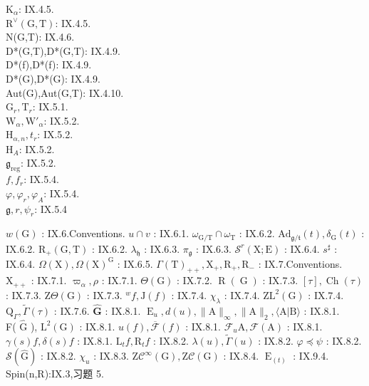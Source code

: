 \(\mathrm{K}_{\alpha}\): IX.4.5.\\
\(\mathrm{R}^{\vee}(\mathrm{G},\mathrm{T})\): IX.4.5.\\
N(G,T): IX.4.6.\\
D*(G,T),D*(G,T): IX.4.9.\\
D*(f),D*(f): IX.4.9.\\
D*(G),D*(G): IX.4.9.\\
Aut(G),Aut(G,T): IX.4.10.\\
\(\mathrm{G}_{r},\mathrm{T}_{r}\): IX.5.1.\\
\(\mathrm{W}_{\alpha},\mathrm{W}'_{\alpha}\): IX.5.2.\\
\(\mathrm{H}_{\alpha,n},t_{r}\): IX.5.2.\\
\(\mathrm{H}_{A}\): IX.5.2.\\
\(\mathfrak{g}_{\mathrm{reg}}\): IX.5.2.\\
\(f,f_{r}\): IX.5.4.\\
\(\varphi,\varphi_{r},\varphi_{A}\): IX.5.4.\\
\(\mathfrak{g},r,\psi_{r}\): IX.5.4

\(w(\mathrm{G})\) : IX.6.Conventions. \(u\cap v\) : IX.6.1. \(\omega_{\mathrm{G / T}}\cap \omega_{\mathrm{T}}\) : IX.6.2. \(\mathrm{Ad}_{\mathfrak{g} / \mathfrak{t}}(t),\delta_{\mathrm{G}}(t)\) : IX.6.2. \(\mathrm{R}_+(\mathrm{G},\mathrm{T})\) : IX.6.2. \(\lambda_{\mathfrak{h}}\) : IX.6.3. \(\pi_{\mathfrak{g}}\) : IX.6.3. \(\mathcal{S}^r (\mathrm{X};\mathrm{E})\) : IX.6.4. \(s^\sharp\) : IX.6.4. \(\Omega (\mathrm{X}),\Omega (\mathrm{X})^{\mathrm{G}}\) : IX.6.5. \(\Gamma (\mathrm{T})_{++},\mathrm{X}_{+},\mathrm{R}_{+},\mathrm{R}_{-}\) : IX.7.Conventions. \(\mathrm{X}_{++}\) : IX.7.1. \(\varpi_{\alpha},\rho\) : IX.7.1. \(\Theta (\mathrm{G})\) : IX.7.2. \(\operatorname {R}(\operatorname {G})\) : IX.7.3. \([\tau ],\operatorname {Ch}(\tau)\) : IX.7.3. \(\mathrm{Z}\Theta (\mathrm{G})\) : IX.7.3. \(^w f,\mathrm{J}(f)\) : IX.7.4. \(\chi_{\lambda}\) : IX.7.4. \(\mathrm{ZL}^2 (\mathrm{G})\) : IX.7.4. \(\mathrm{Q}_{\Gamma},\tilde{\Gamma} (\tau)\) : IX.7.6. \(\hat{\mathbf{G}}\) : IX.8.1. \(\operatorname {E}_u,d(u),\| \mathrm{A}\|_\infty ,\| \mathrm{A}\| _2,\langle \mathrm{A}|\mathrm{B}\rangle\) : IX.8.1.\\
F( \(\hat{\mathrm{G}}\) ), \(\mathrm{L}^2 (\mathrm{G})\) : IX.8.1. \(u(f),\overline{\mathcal{F}} (f)\) : IX.8.1. \(\mathcal{F}_u\mathrm{A},\mathcal{F}(\mathrm{A})\) : IX.8.1. \(\gamma (s)f,\delta (s)f\) : IX.8.1. \(\mathrm{L}_t f,\mathrm{R}_t f\) : IX.8.2. \(\lambda (u),\tilde{\Gamma} (u)\) : IX.8.2. \(\varphi \preccurlyeq \psi\) : IX.8.2. \(\mathcal{S}(\hat{\mathrm{G}})\) : IX.8.2. \(\chi_u\) : IX.8.3. \(\mathrm{Z}\mathcal{C}^{\infty}(\mathrm{G}),\mathrm{Z}\mathcal{C}(\mathrm{G})\) : IX.8.4. \(\operatorname {E}_{(t)}\) : IX.9.4.\\
Spin(n,R):IX.3,习题 5.

